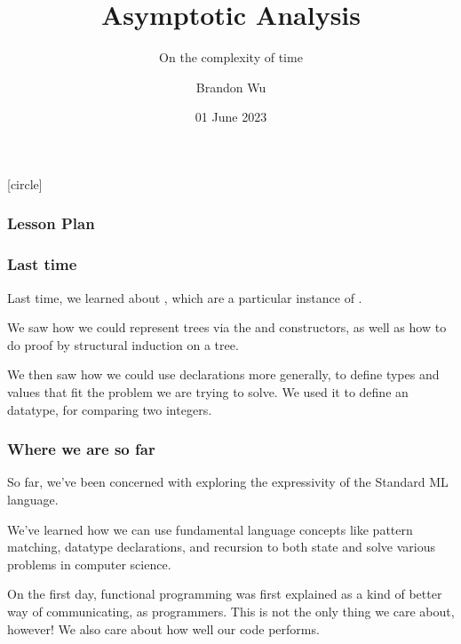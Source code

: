\documentclass[aspectratio=169, handout]{beamer}
\title{Asymptotic Analysis} %
\subtitle{On the complexity of time} %
\date{01 June 2023} %
\author{Brandon Wu} %
\newif\ifcolorlambda
\begin{document}
\ifweb
    \renewcommand{\pause}{}
\fi

[circle]

{
\begin{frame}[plain]
    \colorlambdatrue
    \titlepage
\end{frame}
}

\begin{frame}[fragile]
  \frametitle{Lesson Plan}

  \tableofcontents
\end{frame}

\begin{frame}[fragile]
  \frametitle{Last time}

  Last time, we learned about , which are a particular instance of
  .

  \vspace{\fill}

  We saw how we could represent trees via the  and  
  constructors, as well as how to do proof by structural induction on a tree. 

  \vspace{\fill}

  We then saw how we could use  declarations more generally, to
  define types and values that fit the problem we are trying to solve. We used
  it to define an  datatype, for comparing two integers.
\end{frame}


\begin{frame}[fragile]
  \frametitle{Where we are so far}

  So far, we've been concerned with exploring the expressivity of the Standard ML
  language.

  \pause
  \vspace{\fill}

  We've learned how we can use fundamental language concepts like 
  pattern matching, datatype declarations, and recursion
  to both state and solve various problems in computer science.

  \pause
  \vspace{\fill}

  On the first day, functional programming was first explained as a kind of 
  better way of communicating, as programmers. This is not the only thing we
  care about, however! We also care about how well our code performs.
\end{frame}
\end{document}
